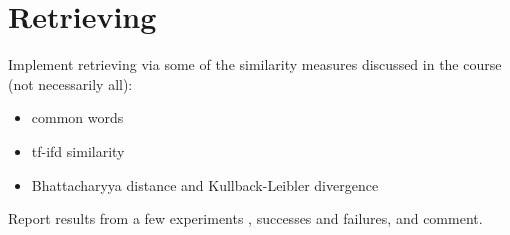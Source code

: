 \documentclass[a4paper,12pts]{article}
\begin{document}
\section {Retrieving}

Implement retrieving via some of the similarity measures discussed in
the course (not necessarily all):
\begin{itemize}
\item common words
\item tf-ifd similarity
\item Bhattacharyya distance and Kullback-Leibler divergence
\end{itemize}

Report results from a few experiments , successes and failures, and
comment.
\end{document}
